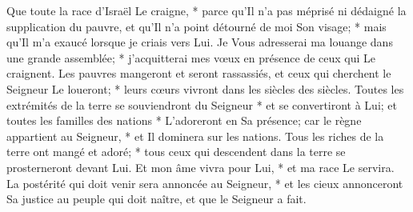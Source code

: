 \versseparator
 Que toute la race d'Israël Le craigne, * parce qu'Il n'a pas méprisé ni dédaigné la supplication du pauvre, et qu'Il n'a point détourné de moi Son visage; * mais qu'Il m'a exaucé lorsque je criais vers Lui.
\versseparator
 Je Vous adresserai ma louange dans une grande assemblée; * j'acquitterai mes vœux en présence de ceux qui Le craignent.
\versseparator
 Les pauvres mangeront et seront rassassiés, et ceux qui cherchent le Seigneur Le loueront; * leurs cœurs vivront dans les siècles des siècles.
\versseparator
 Toutes les extrémités de la terre se souviendront du Seigneur * et se convertiront à Lui;
\versseparator
 et toutes les familles des nations * L'adoreront en Sa présence;
\versseparator
 car le règne appartient au Seigneur, * et Il dominera sur les nations.
\versseparator
 Tous les riches de la terre ont mangé et adoré; * tous ceux qui descendent dans la terre se prosterneront devant Lui.
\versseparator
 Et mon âme vivra pour Lui, * et ma race Le servira.
\versseparator
 La postérité qui doit venir sera annoncée au Seigneur, * et les cieux annonceront Sa justice au peuple qui doit naître, et que le Seigneur a fait.